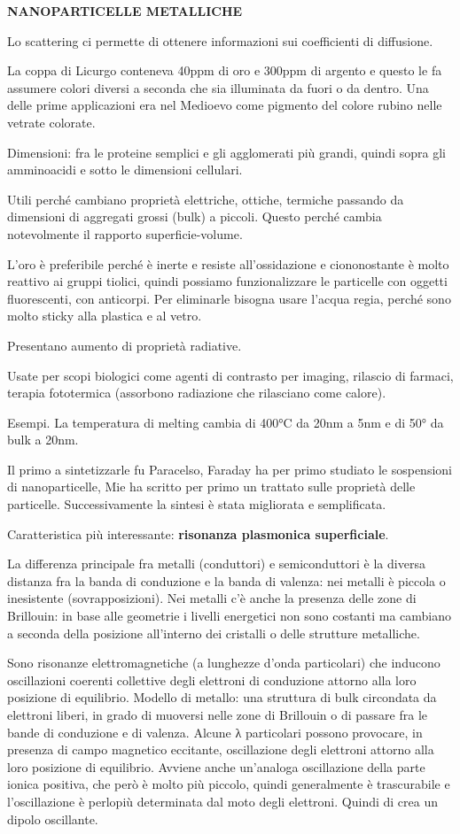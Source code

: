 \textbf{NANOPARTICELLE METALLICHE}

Lo scattering ci permette di ottenere informazioni sui coefficienti di
diffusione.

La coppa di Licurgo conteneva 40ppm di oro e 300ppm di argento e questo
le fa assumere colori diversi a seconda che sia illuminata da fuori o da
dentro. Una delle prime applicazioni era nel Medioevo come pigmento del
colore rubino nelle vetrate colorate.

Dimensioni: fra le proteine semplici e gli agglomerati più grandi,
quindi sopra gli amminoacidi e sotto le dimensioni cellulari.

Utili perché cambiano proprietà elettriche, ottiche, termiche passando
da dimensioni di aggregati grossi (bulk) a piccoli. Questo perché cambia
notevolmente il rapporto superficie-volume.

L'oro è preferibile perché è inerte e resiste all'ossidazione e
ciononostante è molto reattivo ai gruppi tiolici, quindi possiamo
funzionalizzare le particelle con oggetti fluorescenti, con anticorpi.
Per eliminarle bisogna usare l'acqua regia, perché sono molto sticky
alla plastica e al vetro.

Presentano aumento di proprietà radiative.

Usate per scopi biologici come agenti di contrasto per imaging, rilascio
di farmaci, terapia fototermica (assorbono radiazione che rilasciano
come calore).

Esempi. La temperatura di melting cambia di 400°C da 20nm a 5nm e di 50°
da bulk a 20nm.

Il primo a sintetizzarle fu Paracelso, Faraday ha per primo studiato le
sospensioni di nanoparticelle, Mie ha scritto per primo un trattato
sulle proprietà delle particelle. Successivamente la sintesi è stata
migliorata e semplificata.

Caratteristica più interessante: \textbf{risonanza plasmonica
superficiale}.

La differenza principale fra metalli (conduttori) e semiconduttori è la
diversa distanza fra la banda di conduzione e la banda di valenza: nei
metalli è piccola o inesistente (sovrapposizioni). Nei metalli c'è anche
la presenza delle zone di Brillouin: in base alle geometrie i livelli
energetici non sono costanti ma cambiano a seconda della posizione
all'interno dei cristalli o delle strutture metalliche.

Sono risonanze elettromagnetiche (a lunghezze d'onda particolari) che
inducono oscillazioni coerenti collettive degli elettroni di conduzione
attorno alla loro posizione di equilibrio. Modello di metallo: una
struttura di bulk circondata da elettroni liberi, in grado di muoversi
nelle zone di Brillouin o di passare fra le bande di conduzione e di
valenza. Alcune λ particolari possono provocare, in presenza di campo
magnetico eccitante, oscillazione degli elettroni attorno alla loro
posizione di equilibrio. Avviene anche un'analoga oscillazione della
parte ionica positiva, che però è molto più piccolo, quindi generalmente
è trascurabile e l'oscillazione è perlopiù determinata dal moto degli
elettroni. Quindi di crea un dipolo oscillante.

